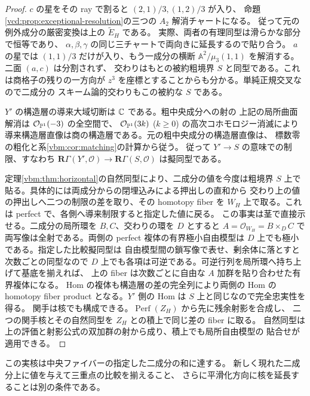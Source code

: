 \begin{proof}
$c$ の星をその ray で割ると $(2,1)/3,(1,2)/3$ が入り、
命題\ref{vcd:prop:exceptional-resolution}の三つの $A_2$ 解消チャートになる。
従って元の例外成分の厳密変換は上の $\widetilde E_H$ である。
実際、両者の有理同型は滑らかな部分で恒等であり、
$\alpha,\beta,\gamma$ の同じ三チャートで両向きに延長するので貼り合う。
$a$ の星では $(1,1)/3$ だけが入り、もう一成分の横断
$\mathbb A^2/\mu_3(1,1)$ を解消する。二面 $(a,c)$ は分割されず、
交わりはもとの被約粗境界 $S$ と同型である。これは商格子の残りの一方向が
$z^3$ を座標とすることからも分かる。単純正規交叉なので二成分の
スキーム論的交わりもこの被約な $S$ である。

$Y'$ の構造層の導来大域切断は $\mathbb C$ である。粗中央成分への射の
上記の局所曲面解消は $\mathcal O_{\mathbb P^1}(-3)$ の全空間で、
$\mathcal O_{\mathbb P^1}(3k)$ ($k\ge0$) の高次コホモロジー消滅により
導来構造層直像は商の構造層である。元の粗中央成分の構造層直像は、
標数零の粗化と系\ref{vbm:cor:matching}の計算から従う。
従って $Y'\to S$ の意味での制限、すなわち
$\mathbf R\Gamma(Y',\mathcal O)\to\mathbf R\Gamma(S,\mathcal O)$ は擬同型である。

定理\ref{vbm:thm:horizontal}の自然同型により、二成分の値を今度は粗境界 $S$
上で貼る。具体的には両成分からの閉埋込みによる押出しの直和から
交わり上の値の押出しへ二つの制限の差を取り、その homotopy fiber を
$W_H$ 上で取る。これは perfect で、各側へ導来制限すると指定した値に戻る。
この事実は茎で直接示せる。二成分の局所環を $B,C$、交わりの環を $D$ とすると
$A=\mathcal O_{W_H}=B\times_D C$ で両写像は全射である。両側の perfect
複体の有界極小自由模型は $D$ 上でも極小である。指定した比較擬同型は
自由模型間の鎖写像で表せ、剰余体に落とすと次数ごとの同型なので
$D$ 上でも各項は可逆である。可逆行列を局所環へ持ち上げて基底を揃えれば、
上の fiber は次数ごとに自由な $A$ 加群を貼り合わせた有界複体になる。
Hom の複体も構造層の差の完全列により両側の Hom の homotopy fiber product
となる。$Y'$ 側の Hom は $S$ 上と同じなので完全忠実性を得る。
関手は核でも構成できる。$\operatorname{Perf}(Z_H)$ から先に残余射影を合成し、
二つの関手核とその自然同型を $Z_H$ との積上で同じ差の fiber に取る。
自然同型は上の評価と射影公式の双加群の射から成り、積上でも局所自由模型の
貼合せが適用できる。
\end{proof}
この実核は中央ファイバーの指定した二成分の和に達する。
新しく現れた二成分上に値を与えて三重点の比較を揃えること、
さらに平滑化方向に核を延長することは別の条件である。

